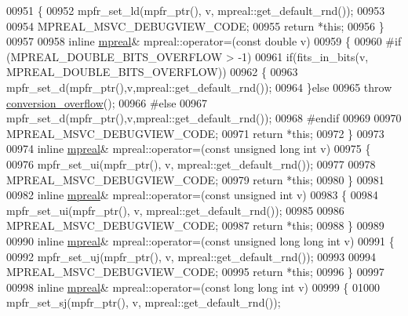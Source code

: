 \begin{DoxyCode}
00951 \{
00952     mpfr\_set\_ld(mpfr\_ptr(), v, mpreal::get\_default\_rnd());
00953 
00954     MPREAL\_MSVC\_DEBUGVIEW\_CODE;
00955     \textcolor{keywordflow}{return} *\textcolor{keyword}{this};
00956 \}
00957 
00958 \textcolor{keyword}{inline} \hyperlink{classmpfr_1_1mpreal}{mpreal}& mpreal::operator=(\textcolor{keyword}{const} \textcolor{keywordtype}{double} v)
00959 \{
00960 \textcolor{preprocessor}{#if (MPREAL\_DOUBLE\_BITS\_OVERFLOW > -1)}
00961   \textcolor{keywordflow}{if}(fits\_in\_bits(v, MPREAL\_DOUBLE\_BITS\_OVERFLOW))
00962   \{
00963     mpfr\_set\_d(mpfr\_ptr(),v,mpreal::get\_default\_rnd());
00964   \}\textcolor{keywordflow}{else}
00965     \textcolor{keywordflow}{throw} \hyperlink{classmpfr_1_1conversion__overflow}{conversion\_overflow}();
00966 \textcolor{preprocessor}{#else}
00967   mpfr\_set\_d(mpfr\_ptr(),v,mpreal::get\_default\_rnd());
00968 \textcolor{preprocessor}{#endif}
00969 
00970   MPREAL\_MSVC\_DEBUGVIEW\_CODE;
00971     \textcolor{keywordflow}{return} *\textcolor{keyword}{this};
00972 \}
00973 
00974 \textcolor{keyword}{inline} \hyperlink{classmpfr_1_1mpreal}{mpreal}& mpreal::operator=(\textcolor{keyword}{const} \textcolor{keywordtype}{unsigned} \textcolor{keywordtype}{long} \textcolor{keywordtype}{int} v)
00975 \{
00976     mpfr\_set\_ui(mpfr\_ptr(), v, mpreal::get\_default\_rnd());
00977 
00978     MPREAL\_MSVC\_DEBUGVIEW\_CODE;
00979     \textcolor{keywordflow}{return} *\textcolor{keyword}{this};
00980 \}
00981 
00982 \textcolor{keyword}{inline} \hyperlink{classmpfr_1_1mpreal}{mpreal}& mpreal::operator=(\textcolor{keyword}{const} \textcolor{keywordtype}{unsigned} \textcolor{keywordtype}{int} v)
00983 \{
00984     mpfr\_set\_ui(mpfr\_ptr(), v, mpreal::get\_default\_rnd());
00985 
00986     MPREAL\_MSVC\_DEBUGVIEW\_CODE;
00987     \textcolor{keywordflow}{return} *\textcolor{keyword}{this};
00988 \}
00989 
00990 \textcolor{keyword}{inline} \hyperlink{classmpfr_1_1mpreal}{mpreal}& mpreal::operator=(\textcolor{keyword}{const} \textcolor{keywordtype}{unsigned} \textcolor{keywordtype}{long} \textcolor{keywordtype}{long} \textcolor{keywordtype}{int} v)
00991 \{
00992     mpfr\_set\_uj(mpfr\_ptr(), v, mpreal::get\_default\_rnd());
00993 
00994     MPREAL\_MSVC\_DEBUGVIEW\_CODE;
00995     \textcolor{keywordflow}{return} *\textcolor{keyword}{this};
00996 \}
00997 
00998 \textcolor{keyword}{inline} \hyperlink{classmpfr_1_1mpreal}{mpreal}& mpreal::operator=(\textcolor{keyword}{const} \textcolor{keywordtype}{long} \textcolor{keywordtype}{long} \textcolor{keywordtype}{int} v)
00999 \{
01000     mpfr\_set\_sj(mpfr\_ptr(), v, mpreal::get\_default\_rnd());

\end{DoxyCode}
